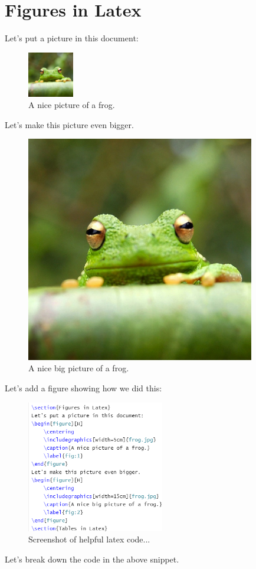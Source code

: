 \documentclass[11pt]{article}
\begin{document}
\section{Figures in Latex}
Let's put a picture in this document:
\begin{figure}[H]
    \centering
    \includegraphics[width=2cm]{frog.jpg}
    \caption{A nice picture of a frog.}
    \label{fig:1}
\end{figure}
Let's make this picture even bigger.
\begin{figure}[H]
    \centering
    \includegraphics[width=10cm]{frog.jpg}
    \caption{A nice big picture of a frog.}
    \label{fig:2}
\end{figure}
Let's add a figure showing how we did this:
\begin{figure}[H]
    \centering
    \includegraphics[width=6cm]{screenshot.png}
    \caption{Screenshot of helpful latex code...}
    \label{fig:3}
\end{figure}
Let's break down the code in the above snippet.
\end{document}
